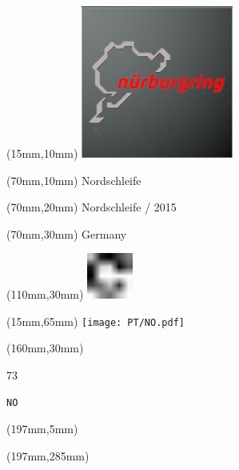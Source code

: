 \null\newpage
\begin{textblock*}{50mm}(15mm,10mm)%
\includegraphics[width=50mm]{LG/2015-05-20_00088.png}
\end{textblock*}
\begin{textblock*}{130mm}(70mm,10mm)%
{\fontsize{20}{20}\selectfont Nordschleife}\\
\end{textblock*}
\begin{textblock*}{120mm}(70mm,20mm)%
{\fontsize{16}{16}\selectfont Nordschleife / 2015}\\
\end{textblock*}
\begin{textblock*}{120mm}(70mm,30mm)%
{\fontsize{12}{12}\selectfont Germany}
\end{textblock*}
\begin{textblock*}{30mm}(110mm,30mm)%
\centering
\includegraphics[height=15mm]{icons/fa-rotate-right.pdf}
\end{textblock*}
\begin{textblock*}{185mm}(15mm,65mm)%
\centering
\mbox{\texttt{[image: PT/NO.pdf]}}
\end{textblock*}
\begin{textblock*}{40mm}(160mm,30mm)%
\Large
\par{} 
\par73 
\par\hfill\tiny\tt NO\\
\end{textblock*}
\begin{textblock*}{20mm}(197mm,5mm)%
\fbox{\thepage}
\label{NO}
\end{textblock*}
\begin{textblock*}{20mm}(197mm,285mm)%
\fbox{\thepage}
\end{textblock*}

